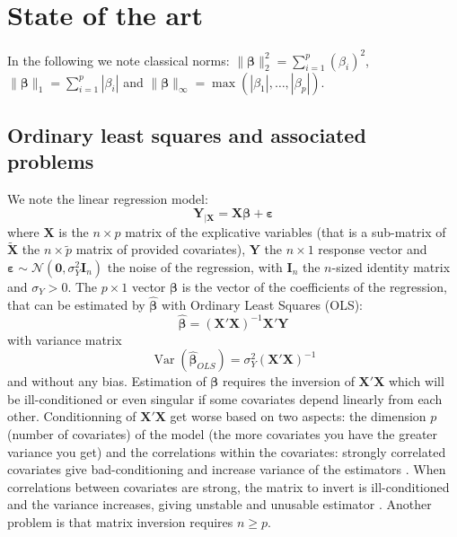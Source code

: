 \documentclass[11pt,a4paper]{report}
\begin{document}
	
\chapter{State of the art}
In the following we note classical norms: $\parallel\boldsymbol{\beta}\parallel_2^2=\sum_{i=1}^p(\beta_i)^2$, $\parallel\boldsymbol{\beta} \parallel_1=\sum_{i=1}^p|\beta_i| $ and $\parallel\boldsymbol{\beta} \parallel_{\infty}=\operatorname{max}(|\beta_1|,\dots,|\beta_p|)$.
	\section{Ordinary least squares and associated problems}\label{sectionOLS}
We note the linear regression model:
\begin{equation}
		\boldsymbol{Y}_{|\boldsymbol{X}}=\boldsymbol{X}\boldsymbol{\beta} + \boldsymbol{\varepsilon} \label{regressionsimple}
	\end{equation}
	where $\boldsymbol{X}$ is the $n\times p$ matrix of the explicative variables (that is a sub-matrix of $\tilde{\boldsymbol{X}}$ the $n\times \tilde{p}$ matrix of provided covariates), $\boldsymbol{Y}$ the  $n\times 1$ response vector and $\boldsymbol{\varepsilon} \sim \mathcal{N}(\boldsymbol{0},\sigma_Y^2\boldsymbol{I}_n)$ the noise of the regression, with $\boldsymbol{I}_n$ the $n$-sized identity matrix and $\sigma_Y >0$. The $p\times 1$ vector $\boldsymbol{\beta}$ is the vector of the coefficients of the regression, that can be estimated by $\hat{\boldsymbol{\beta}}$ with Ordinary Least Squares (\textsc{OLS}): %
	\begin{equation}
		\boldsymbol{\hat{\beta}}=\left(\boldsymbol{X}'\boldsymbol{X} \right) ^{-1}\boldsymbol{X}'\boldsymbol{Y}
	\end{equation}
	with variance matrix
	\begin{equation}
		\operatorname{Var}(\hat{\boldsymbol{\beta}}_{OLS})=\sigma_Y^2\left(\boldsymbol{X}'\boldsymbol{X} \right) ^{-1} \label{eqOLS}
	\end{equation}
	and without any bias.
	Estimation of $\boldsymbol{\beta}$ requires the inversion of $\boldsymbol{X}'\boldsymbol{X}$ which will be ill-conditioned or even singular if some covariates depend linearly from each other. 
Conditionning of $\boldsymbol{X}'\boldsymbol{X}$ get worse based on two aspects: the dimension $p$ (number of covariates) of the model (the more covariates you have the greater variance you get)
	 and the correlations within the covariates: strongly correlated covariates give bad-conditioning and increase variance of the estimators .
	When correlations between covariates are strong, the matrix to invert is ill-conditioned and the variance increases, giving unstable and unusable estimator \cite{hoerl1970ridge}.
	Another problem is that matrix inversion requires $n\geq p$. 	
\end{document}
